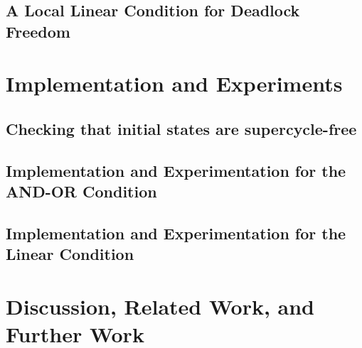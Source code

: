 \documentclass[11pt]{article}
\begin{document}
   \subsection{A Local Linear Condition for Deadlock Freedom}
   \label{s:condition}
   


\section{Implementation and Experiments}
\label{s:impl}

   \subsection{Checking that initial states are supercycle-free}
   \label{s:initSCFree}
   

   \subsection{Implementation and Experimentation for the AND-OR Condition}
   \label{s:implANDOR}
   

   \clearpage
   \subsection{Implementation and Experimentation for the Linear Condition}
   \label{s:implLin}
   






\clearpage
\section{Discussion, Related Work, and Further Work}
\label{s:discussion}








%
%
\end{document}
